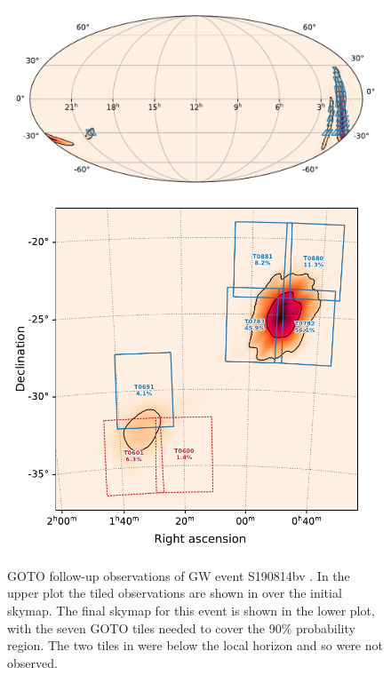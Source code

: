 \begin{colsection}
\begin{figure}[p]
    \begin{center}
        \includegraphics[width=0.9\linewidth]{images/190814_goto.pdf}
        \includegraphics[width=0.8\linewidth]{images/190814_goto2.pdf}
    \end{center}
    \caption[Follow-up observations of S190814bv with GOTO]{
        GOTO follow-up observations of GW event S190814bv \citep{S190814bv_GOTO}. In the upper plot the tiled observations are shown in  over the initial skymap. The final skymap for this event is shown in the lower plot, with the seven GOTO tiles needed to cover the 90\% probability region. The two tiles in  were below the local horizon and so were not observed.
        }\label{fig:190826_goto}
\end{figure}

\clearpage

\makeatletter
\setlength{\@fptop}{0\p@ \@plus 1fil} %
\makeatother

\newpage

\end{colsection}

